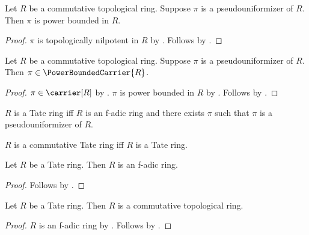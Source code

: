 \begin{theorem}\label{pseudouniformizer_power_bounded}
    Let $R$ be a commutative topological ring.
    Suppose $\pi$ is a pseudouniformizer of $R$.
    Then $\pi$ is power bounded in $R$.
\end{theorem}
\begin{proof}
    $\pi$ is topologically nilpotent in $R$ by
        .
    Follows by .
\end{proof}

\begin{corollary}\label{pseudouniformizer_in_power_bounded_carrier}
    Let $R$ be a commutative topological ring.
    Suppose $\pi$ is a pseudouniformizer of $R$.
    Then $\pi\in\PowerBoundedCarrier{R}$.
\end{corollary}
\begin{proof}
    $\pi\in\carrier[R]$ by .
    $\pi$ is power bounded in $R$ by
        .
    Follows by .
\end{proof}

\begin{definition}\label{tate_ring}
    $R$ is a Tate ring iff
        $R$ is an f-adic ring and
        there exists $\pi$ such that $\pi$ is a pseudouniformizer of $R$.
\end{definition}

\begin{abbreviation}\label{commutative_tate_ring}
    $R$ is a commutative Tate ring iff $R$ is a Tate ring.
\end{abbreviation}

\begin{proposition}\label{tate_ring_is_f_adic_ring}
    Let $R$ be a Tate ring.
    Then $R$ is an f-adic ring.
\end{proposition}
\begin{proof}
    Follows by .
\end{proof}

\begin{classification}\label{tate_ring_is_commutative_topological_ring}
    Let $R$ be a Tate ring.
    Then $R$ is a commutative topological ring.
\end{classification}
\begin{proof}
    $R$ is an f-adic ring by .
    Follows by .
\end{proof}

